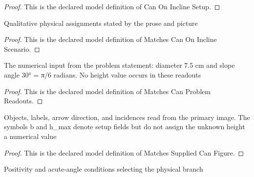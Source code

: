 \begin{proof}
  This is the declared model definition of Can On Incline Setup.
\end{proof}
\begin{definition}
  \label{def:physics:phyx-mini-0710:phyxminiproblems-problemphyxmini0710-matchescanoninclinescenario}
  Qualitative physical assignments stated by the prose and picture
\end{definition}
\begin{proof}
  This is the declared model definition of Matches Can On Incline Scenario.
\end{proof}
\begin{definition}
  \label{def:physics:phyx-mini-0710:phyxminiproblems-problemphyxmini0710-matchescanproblemreadouts}
  The numerical input from the problem statement: diameter 7.5 cm and slope angle 30° = π/6 radians. No height value occurs in these readouts
\end{definition}
\begin{proof}
  This is the declared model definition of Matches Can Problem Readouts.
\end{proof}
\begin{definition}
  \label{def:physics:phyx-mini-0710:phyxminiproblems-problemphyxmini0710-matchessuppliedcanfigure}
  Objects, labels, arrow direction, and incidences read from the primary image. The symbols b and h\_max denote setup fields but do not assign the unknown height a numerical value
\end{definition}
\begin{proof}
  This is the declared model definition of Matches Supplied Can Figure.
\end{proof}
\begin{definition}
  \label{def:physics:phyx-mini-0710:phyxminiproblems-problemphyxmini0710-hasphysicalcanparameters}
  Positivity and acute-angle conditions selecting the physical branch
\end{definition}
